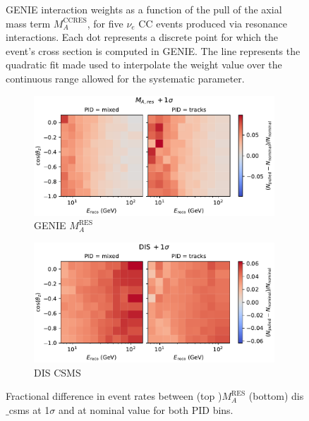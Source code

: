\begin{figure}
    \centering
    
    \caption{\textsc{GENIE} interaction weights as a function of the pull of the axial mass term $M_{A}^{\mathrm{CCRES}}$, for five $\nu_{e}$ CC events produced via resonance interactions. Each dot represents a discrete point for which the event's cross section is computed in \textsc{GENIE}. The  line represents the quadratic fit made used to interpolate the weight value over the continuous range allowed for the systematic parameter.}
    \label{fig:resonant_mass}
\end{figure}

\begin{figure}[!t] 
    \centering
    \begin{subfigure}[t]{0.9\textwidth}
        \centering
        \includegraphics[width=0.99\textwidth,trim={0 0 0 0.6cm},clip]{figures/measurement/systematics/xsec/Genie_Ma_RES.pdf}
        \caption{GENIE $M_{A}^\mathrm{RES}$}
    \end{subfigure}
    \begin{subfigure}[t]{0.9\textwidth}
        \centering
        \includegraphics[width=0.99\textwidth,trim={0 0 0 0.6cm},clip]{figures/measurement/systematics/xsec/dis_csms.pdf}
        \caption{DIS CSMS}
    \end{subfigure}  
  \caption{Fractional difference in event rates between (top )$M_{A}^\mathrm{RES}$ (bottom) dis$\_$csms at 1$\sigma$ and at nominal value for both PID bins.
  \label{fig:template_xsecsyst}}
\end{figure}

